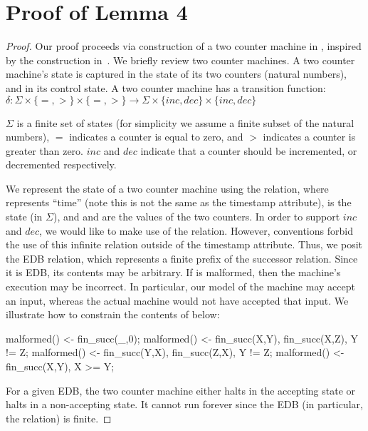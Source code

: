 \section{Proof of Lemma 4}
\begin{proof}
Our proof proceeds via construction of a two counter machine in \lang, inspired by the construction in~\cite{undecidable-datalog}. We briefly review two counter machines.  A two counter machine's state is captured in the state of its two counters (natural numbers), and in its control state.  A two counter machine has a transition function: $\delta: \Sigma \times \{=, >\} \times \{=, >\} \rightarrow \Sigma \times \{inc, dec\} \times \{inc, dec\}$

$\Sigma$ is a finite set of states (for simplicity we assume a finite subset of the natural numbers), $=$ indicates a counter is equal to zero, and $>$ indicates a counter is greater than zero.  $inc$ and $dec$ indicate that a counter should be incremented, or decremented respectively.

We represent the state of a two counter machine using the \linebreak {} relation, where  represents ``time'' (note this is not the same as the timestamp attribute),  is the state (in $\Sigma$), and  and  are the values of the two counters.  In order to support $inc$ and $dec$, we would like to make use of the  relation.  However, \lang conventions forbid the use of this infinite relation outside of the timestamp attribute.  Thus, we posit the  EDB relation, which represents a finite prefix of the successor relation.  Since it is EDB, its contents may be arbitrary.  If  is malformed, then the machine's execution may be incorrect.  In particular, our model of the machine may accept an input, whereas the actual machine would not have accepted that input.  We illustrate how to constrain the contents of  below:

\begin{Dedalus}
malformed() <- fin_succ(_,0);
malformed() <- fin_succ(X,Y), fin_succ(X,Z), Y != Z;
malformed() <- fin_succ(Y,X), fin_succ(Z,X), Y != Z;
malformed() <- fin_succ(X,Y), X >= Y;
\end{Dedalus}

For a given EDB, the two counter machine either halts in the accepting state or halts in a non-accepting state.  It cannot run forever since the EDB (in particular, the  relation) is finite.


\end{proof}
